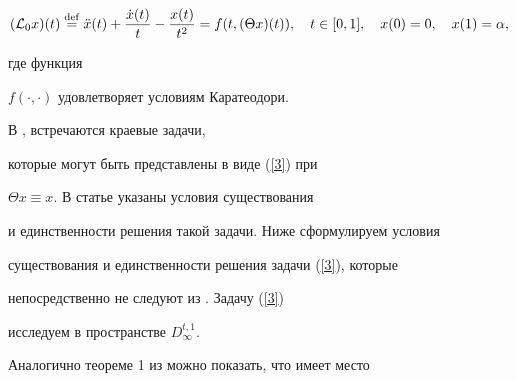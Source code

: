 \begin{equation}


({\cal L}_0 x)(t) \eqdef


\Ddot x(t)+ \frac{\Dot x(t)}{t} - \frac{x(t)}{t^2}=


f(t, (\Theta x)(t)),\quad t\in [0,1],\quad


x(0)=0,\quad x(1) =\alpha,


\label{3}


\end{equation}


где функция


$f(\cdot,\cdot)$ удовлетворяет условиям Каратеодори.





В \cite{4}, \cite{5} встречаются краевые задачи,


которые могут быть представлены в виде (\ref{3}) при


$\Theta x\equiv x.$ В статье \cite{6} указаны условия существования


и единственности решения такой задачи. Ниже сформулируем условия


существования и единственности решения задачи (\ref{3}), которые


непосредственно не следуют из \cite{6}. Задачу (\ref{3})


исследуем в пространстве ${ D}_{\infty}^{t,1}$.





Аналогично теореме 1 из \cite{7} можно показать, что имеет место





